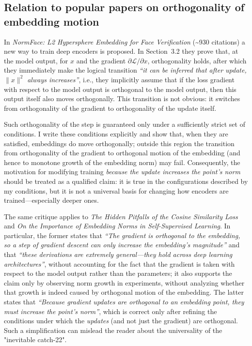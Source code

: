 \subsection{Relation to popular papers on orthogonality of embedding motion}

In \emph{NormFace: L2 Hypersphere Embedding for Face Verification} (\textasciitilde930 citations) a new way to train deep encoders is proposed. In Section~3.2 they prove that, at the model output, for $x$ and the gradient $\partial\mathcal{L}/\partial x$, orthogonality holds, after which they immediately make the logical transition \emph{``it can be inferred that after update, $\|x\|^2$ always increases''}, i.e., they implicitly assume that if the loss gradient with respect to the model output is orthogonal to the model output, then this output itself also moves orthogonally. This transition is not obvious: it switches from orthogonality of the gradient to orthogonality of the update itself.

Such orthogonality of the step is guaranteed only under a sufficiently strict set of conditions. I write these conditions explicitly and show that, when they are satisfied, embeddings do move orthogonally; outside this region the transition from orthogonality of the gradient to orthogonal motion of the embedding (and hence to monotone growth of the embedding norm) may fail. Consequently, the motivation for modifying training \emph{because the update increases the point's norm} should be treated as a qualified claim: it is true in the configurations described by my conditions, but it is not a universal basis for changing how encoders are trained—especially deeper ones.

The same critique applies to \emph{The Hidden Pitfalls of the Cosine Similarity Loss} and \emph{On the Importance of Embedding Norms in Self-Supervised Learning}. In particular, the former states that \emph{``The gradient is orthogonal to the embedding, so a step of gradient descent can only increase the embedding's magnitude''} and that \emph{``these derivations are extremely general—they hold across deep learning architectures''}, without accounting for the fact that the gradient is taken with respect to the model output rather than the parameters; it also supports the claim only by observing norm growth in experiments, without analyzing whether that growth is indeed caused by orthogonal motion of the embedding. The latter states that \emph{``Because gradient updates are orthogonal to an embedding point, they must increase the point’s norm''}, which is correct only after refining the conditions under which the \emph{updates} (and not just the gradient) are orthogonal. Such a simplification can mislead the reader about the universality of the "inevitable catch-22".

